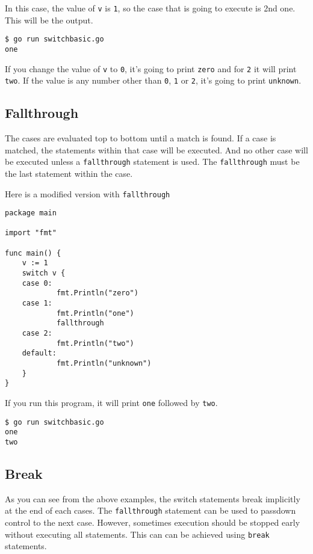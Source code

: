 In this case, the value of \texttt{v} is \texttt{1}, so the case that
is going to execute is 2nd one.  This will be the output.

\begin{lstlisting}[numbers=none]
$ go run switchbasic.go
one
\end{lstlisting}

If you change the value of \texttt{v} to \texttt{0}, it's going to
print \texttt{zero} and for \texttt{2} it will print \texttt{two}.  If
the value is any number other than \texttt{0}, \texttt{1}
or \texttt{2}, it's going to print \texttt{unknown}.

\subsection{Fallthrough}

The cases are evaluated top to bottom until a match is found.  If a
case is matched, the statements within that case will be executed. And
no other case will be executed unless
a \texttt{fallthrough} statement is used.
The \texttt{fallthrough} must be the last statement within the case.

Here is a modified version with \texttt{fallthrough}

\begin{lstlisting}[caption=Switch case with fallthrough]
package main

import "fmt"

func main() {
    v := 1
    switch v {
    case 0:
            fmt.Println("zero")
    case 1:
            fmt.Println("one")
            fallthrough
    case 2:
            fmt.Println("two")
    default:
            fmt.Println("unknown")
    }
}
\end{lstlisting}

If you run this program, it will print \texttt{one} followed
by \texttt{two}.

\begin{lstlisting}[numbers=none]
$ go run switchbasic.go
one
two
\end{lstlisting}

\subsection{Break}

As you can see from the above examples, the switch statements
break implicitly at the end of each cases.
The \texttt{fallthrough} statement can be used to passdown control to
the next case.  However, sometimes execution should be stopped early
without executing all statements.  This can can be achieved
using \texttt{break} statements.

